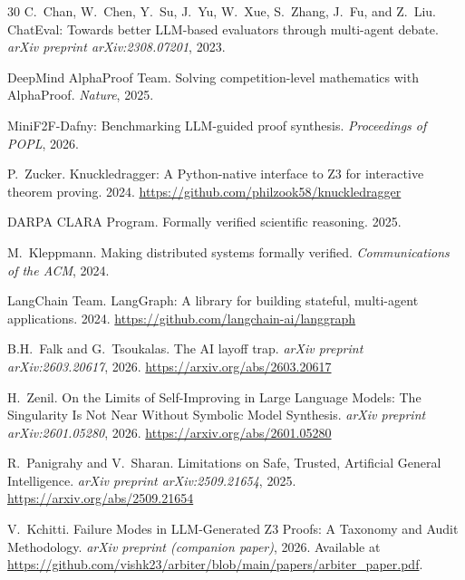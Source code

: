 \documentclass[11pt]{article}
\begin{document}
\begin{thebibliography}{30}
C.~Chan, W.~Chen, Y.~Su, J.~Yu, W.~Xue, S.~Zhang, J.~Fu, and Z.~Liu.
ChatEval: Towards better LLM-based evaluators through multi-agent debate.
\emph{arXiv preprint arXiv:2308.07201}, 2023.

DeepMind AlphaProof Team.
Solving competition-level mathematics with AlphaProof.
\emph{Nature}, 2025.

MiniF2F-Dafny: Benchmarking LLM-guided proof synthesis.
\emph{Proceedings of POPL}, 2026.

P.~Zucker.
Knuckledragger: A Python-native interface to Z3 for interactive theorem proving.
2024.
\url{https://github.com/philzook58/knuckledragger}

DARPA CLARA Program.
Formally verified scientific reasoning.
2025.

M.~Kleppmann.
Making distributed systems formally verified.
\emph{Communications of the ACM}, 2024.

LangChain Team.
LangGraph: A library for building stateful, multi-agent applications.
2024.
\url{https://github.com/langchain-ai/langgraph}

B.H.~Falk and G.~Tsoukalas.
The AI layoff trap.
\emph{arXiv preprint arXiv:2603.20617}, 2026.
\url{https://arxiv.org/abs/2603.20617}

H.~Zenil.
On the Limits of Self-Improving in Large Language Models: The Singularity Is Not Near Without Symbolic Model Synthesis.
\emph{arXiv preprint arXiv:2601.05280}, 2026.
\url{https://arxiv.org/abs/2601.05280}

R.~Panigrahy and V.~Sharan.
Limitations on Safe, Trusted, Artificial General Intelligence.
\emph{arXiv preprint arXiv:2509.21654}, 2025.
\url{https://arxiv.org/abs/2509.21654}

V.~Kchitti.
Failure Modes in {LLM}-Generated {Z3} Proofs: A Taxonomy and Audit Methodology.
\emph{arXiv preprint (companion paper)}, 2026.
Available at \url{https://github.com/vishk23/arbiter/blob/main/papers/arbiter_paper.pdf}.

\end{thebibliography}
\end{document}
